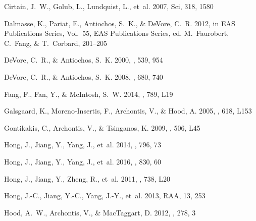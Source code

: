 \documentclass[twocolumn]{aastex6}
\newcommand{\sci}{Sci}
\newcommand{\raa}{RAA}
\begin{document}
\begin{thebibliography}{}
{Cirtain}, J.~W., {Golub}, L., {Lundquist}, L., {et~al.} 2007, \sci, 318, 1580

{Dalmasse}, K., {Pariat}, E., {Antiochos}, S.~K., \& {DeVore}, C.~R. 2012, in
  EAS Publications Series, Vol.~55, EAS Publications Series, ed.
  M.~{Faurobert}, C.~{Fang}, \& T.~{Corbard}, 201--205

{DeVore}, C.~R., \& {Antiochos}, S.~K. 2000, \apj, 539, 954

{DeVore}, C.~R., \& {Antiochos}, S.~K. 2008, \apj, 680, 740

{Fang}, F., {Fan}, Y., \& {McIntosh}, S.~W. 2014, \apjl, 789, L19

{Galsgaard}, K., {Moreno-Insertis}, F., {Archontis}, V., \& {Hood}, A. 2005,
  \apjl, 618, L153

{Gontikakis}, C., {Archontis}, V., \& {Tsinganos}, K. 2009, \aap, 506, L45

{Hong}, J., {Jiang}, Y., {Yang}, J., {et~al.} 2014, \apj, 796, 73

{Hong}, J., {Jiang}, Y., {Yang}, J., {et~al.} 2016, \apj, 830, 60

{Hong}, J., {Jiang}, Y., {Zheng}, R., {et~al.} 2011, \apjl, 738, L20

{Hong}, J.-C., {Jiang}, Y.-C., {Yang}, J.-Y., {et~al.} 2013, \raa, 13, 253

{Hood}, A.~W., {Archontis}, V., \& {MacTaggart}, D. 2012, \solphys, 278, 3


\end{thebibliography}
\end{document}
